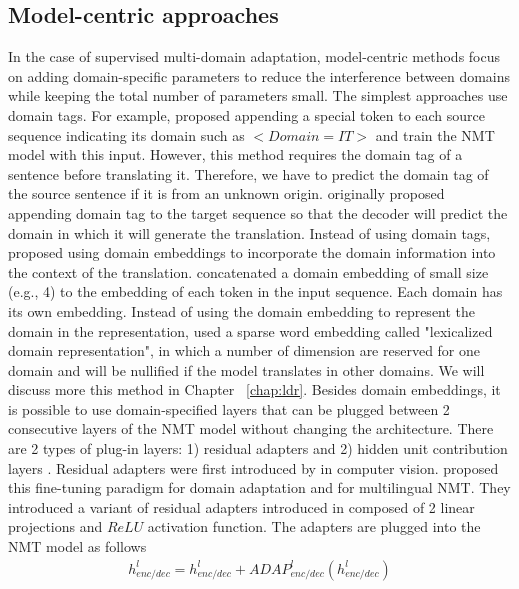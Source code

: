 \subsection{Model-centric approaches}
In the case of supervised multi-domain adaptation, model-centric methods focus on adding domain-specific parameters to reduce the interference between domains while keeping the total number of parameters small. The simplest approaches use domain tags. For example, \citet{Kobus17domain} proposed appending a special token to each source sequence indicating its domain such as $<Domain=IT>$ and train the NMT model with this input. However, this method requires the domain tag of a sentence before translating it. Therefore, we have to predict the domain tag of the source sentence if it is from an unknown origin. \citet{Britz17effective} originally proposed appending domain tag to the target sequence so that the decoder will predict the domain in which it will generate the translation. Instead of using domain tags, \citep{Kobus17domain} proposed using domain embeddings to incorporate the domain information into the context of the translation. \citet{Kobus17domain} concatenated a domain embedding of small size (e.g., 4) to the embedding of each token in the input sequence. Each domain has its own embedding. Instead of using the domain embedding to represent the domain in the representation, \citet{Pham19generic} used a sparse word embedding called "lexicalized domain representation", in which a number of dimension are reserved for one domain and will be nullified if the model translates in other domains. We will discuss more this method in Chapter ~\ref{chap:ldr}. Besides domain embeddings, it is possible to use domain-specified layers that can be plugged between 2 consecutive layers of the NMT model without changing the architecture. There are 2 types of plug-in layers: 1) residual adapters \citep{Bapna19simple, Pham20Study} and 2) hidden unit contribution layers \citep{Vilar18learning}. Residual adapters were first introduced by \citet{Rebuffi17learning} in computer vision. \citet{Bapna19simple} proposed this fine-tuning paradigm for domain adaptation and for multilingual NMT. They introduced a variant of residual adapters introduced in \citet{Rebuffi17learning} composed of 2 linear projections and $ReLU$ activation function. The adapters are plugged into the NMT model as follows
\begin{equation}
\begin{array}{rcl}
h_{enc/dec}^l = h_{enc/dec}^{l} + ADAP_{enc/dec}^l(h_{enc/dec}^{l})
\end{array}
\end{equation}
